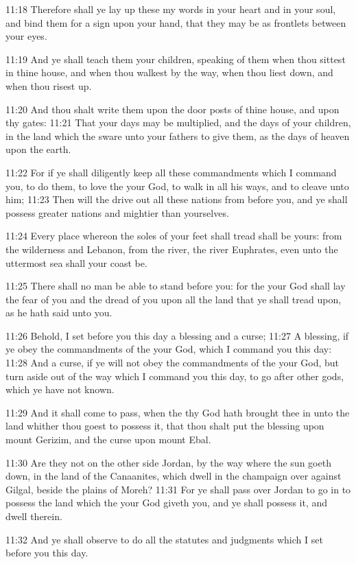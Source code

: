 11:18 Therefore shall ye lay up these my words in your heart and in your soul, and bind them for a sign upon your hand, that they may be as frontlets between your eyes.

11:19 And ye shall teach them your children, speaking of them when thou sittest in thine house, and when thou walkest by the way, when thou liest down, and when thou risest up.

11:20 And thou shalt write them upon the door posts of thine house, and upon thy gates: 11:21 That your days may be multiplied, and the days of your children, in the land which the \LORD sware unto your fathers to give them, as the days of heaven upon the earth.

11:22 For if ye shall diligently keep all these commandments which I command you, to do them, to love the \LORD your God, to walk in all his ways, and to cleave unto him; 11:23 Then will the \LORD drive out all these nations from before you, and ye shall possess greater nations and mightier than yourselves.

11:24 Every place whereon the soles of your feet shall tread shall be yours: from the wilderness and Lebanon, from the river, the river Euphrates, even unto the uttermost sea shall your coast be.

11:25 There shall no man be able to stand before you: for the \LORD your God shall lay the fear of you and the dread of you upon all the land that ye shall tread upon, as he hath said unto you.

11:26 Behold, I set before you this day a blessing and a curse; 11:27 A blessing, if ye obey the commandments of the \LORD your God, which I command you this day: 11:28 And a curse, if ye will not obey the commandments of the \LORD your God, but turn aside out of the way which I command you this day, to go after other gods, which ye have not known.

11:29 And it shall come to pass, when the \LORD thy God hath brought thee in unto the land whither thou goest to possess it, that thou shalt put the blessing upon mount Gerizim, and the curse upon mount Ebal.

11:30 Are they not on the other side Jordan, by the way where the sun goeth down, in the land of the Canaanites, which dwell in the champaign over against Gilgal, beside the plains of Moreh?  11:31 For ye shall pass over Jordan to go in to possess the land which the \LORD your God giveth you, and ye shall possess it, and dwell therein.

11:32 And ye shall observe to do all the statutes and judgments which I set before you this day.

